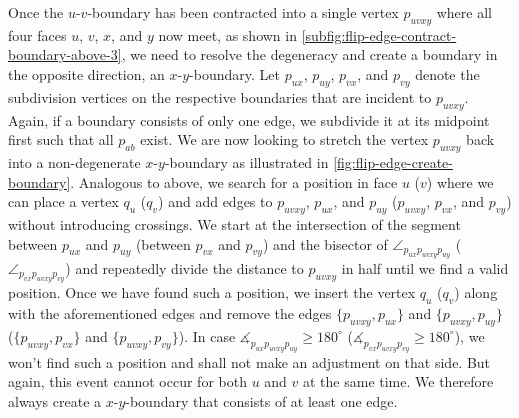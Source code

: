 Once the $u$-$v$-boundary has been contracted into a single vertex $p_{uvxy}$ where all four faces $u$, $v$, $x$, and $y$ now meet, as shown in \cref{subfig:flip-edge-contract-boundary-above-3}, we need to resolve the degeneracy and create a boundary in the opposite direction, \ie{} an $x$-$y$-boundary.
Let $p_{ux}$, $p_{uy}$, $p_{vx}$, and $p_{vy}$ denote the subdivision vertices on the respective boundaries that are incident to $p_{uvxy}$.
Again, if a boundary consists of only one edge, we subdivide it at its midpoint first such that all $p_{ab}$ exist.
We are now looking to stretch the vertex $p_{uvxy}$ back into a non-degenerate $x$-$y$-boundary as illustrated in \cref{fig:flip-edge-create-boundary}.
Analogous to above, we search for a position in face $u$ ($v$) where we can place a vertex $q_u$ ($q_v$) and add edges to $p_{uvxy}$, $p_{ux}$, and $p_{uy}$ ($p_{uvxy}$, $p_{vx}$, and $p_{vy}$) without introducing crossings.
We start at the intersection of the segment between $p_{ux}$ and $p_{uy}$ (between $p_{vx}$ and $p_{vy}$) and the bisector of $\angle_{p_{ux}p_{uvxy}p_{uy}}$ ($\angle_{p_{vx}p_{uvxy}p_{vy}}$) and repeatedly divide the distance to $p_{uvxy}$ in half until we find a valid position.
Once we have found such a position, we insert the vertex $q_u$ ($q_v$) along with the aforementioned edges and remove the edges $\{p_{uvxy},p_{ux}\}$ and $\{p_{uvxy},p_{uy}\}$ ($\{p_{uvxy},p_{vx}\}$ and $\{p_{uvxy},p_{vy}\}$).
In case $\measuredangle_{p_{ux}p_{uvxy}p_{uy}} \geq 180^\circ$ ($\measuredangle_{p_{vx}p_{uvxy}p_{vy}} \geq 180^\circ$), we won't find such a position and shall not make an adjustment on that side.
But again, this event cannot occur for both $u$ and $v$ at the same time.
We therefore always create a $x$-$y$-boundary that consists of at least one edge.

